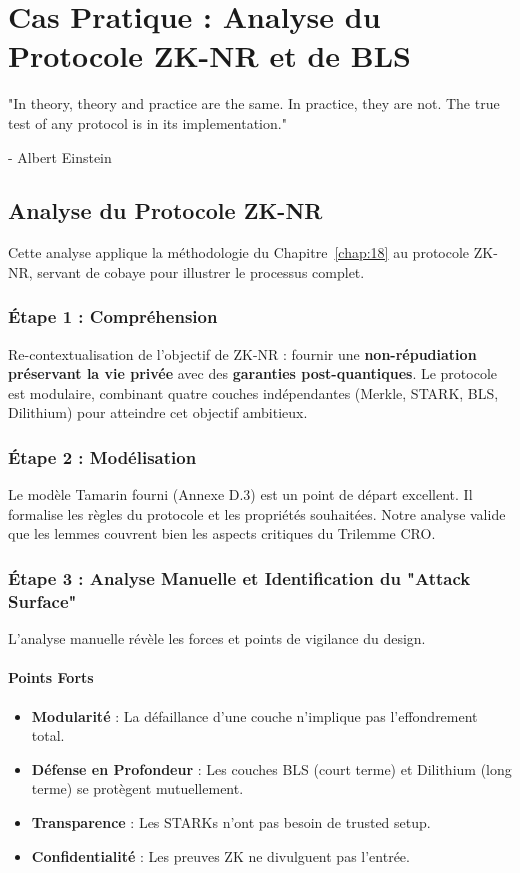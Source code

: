 \chapter{Cas Pratique : Analyse du Protocole ZK-NR et de BLS}
\label{chap:19}

\epigraph{"In theory, theory and practice are the same. In practice, they are not. The true test of any protocol is in its implementation."}{- Albert Einstein}

\section{Analyse du Protocole ZK-NR}
\label{sec:19.1}

Cette analyse applique la méthodologie du Chapitre~\ref{chap:18} au protocole ZK-NR, servant de cobaye pour illustrer le processus complet.

\subsection{Étape 1 : Compréhension}
\label{subsec:19.1.1}
Re-contextualisation de l'objectif de ZK-NR : fournir une \textbf{non-répudiation préservant la vie privée} avec des \textbf{garanties post-quantiques}. Le protocole est modulaire, combinant quatre couches indépendantes (Merkle, STARK, BLS, Dilithium) pour atteindre cet objectif ambitieux.

\subsection{Étape 2 : Modélisation}
\label{subsec:19.1.2}
Le modèle Tamarin fourni (Annexe D.3) est un point de départ excellent. Il formalise les règles du protocole et les propriétés souhaitées. Notre analyse valide que les lemmes couvrent bien les aspects critiques du Trilemme CRO.

\subsection{Étape 3 : Analyse Manuelle et Identification du "Attack Surface"}
\label{subsec:19.1.3}

L'analyse manuelle révèle les forces et points de vigilance du design.

\subsubsection{Points Forts}
\label{subsubsec:19.1.3.1}
\begin{itemize}
    \item \textbf{Modularité} : La défaillance d'une couche n'implique pas l'effondrement total.
    \item \textbf{Défense en Profondeur} : Les couches BLS (court terme) et Dilithium (long terme) se protègent mutuellement.
    \item \textbf{Transparence} : Les STARKs n'ont pas besoin de trusted setup.
    \item \textbf{Confidentialité} : Les preuves ZK ne divulguent pas l'entrée.
\end{itemize}

